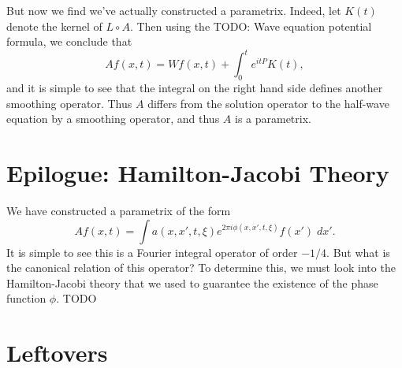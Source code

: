 \documentclass{article}
\theoremstyle{plain}
\theoremstyle{remark}
\theoremstyle{definition}
\begin{document}
But now we find we've actually constructed a parametrix. Indeed, let $K(t)$ denote the kernel of $L \circ A$. Then using the TODO: Wave equation potential formula, we conclude that
%
\[ Af(x,t) = Wf(x,t) + \int_0^t e^{i t P} K(t), \]
%
and it is simple to see that the integral on the right hand side defines another smoothing operator. Thus $A$ differs from the solution operator to the half-wave equation by a smoothing operator, and thus $A$ is a parametrix.


\section{Epilogue: Hamilton-Jacobi Theory}

We have constructed a parametrix of the form
%
\[ Af(x,t) = \int a(x,x',t,\xi) e^{2 \pi i \phi(x,x',t,\xi)} f(x')\; dx'. \]
%
It is simple to see this is a Fourier integral operator of order $-1/4$. But what is the canonical relation of this operator? To determine this, we must look into the Hamilton-Jacobi theory that we used to guarantee the existence of the phase function $\phi$. TODO




\section{Leftovers}
\end{document}
